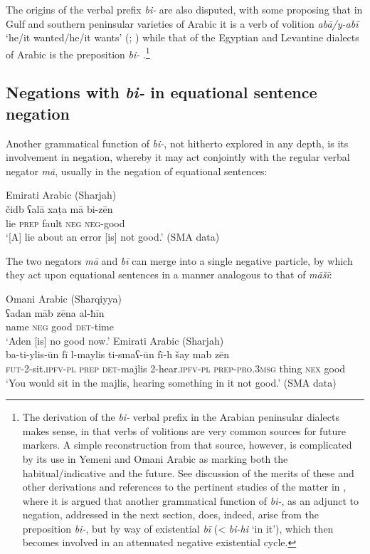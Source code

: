 \documentclass[output=paper]{langsci/langscibook}
\begin{document}
The origins of the verbal prefix \textit{bi-} are also disputed, with some proposing that in Gulf and southern peninsular varieties of Arabic it is a verb of volition \textit{abā/y-abī} ‘he/it wanted/he/it wants’ (\citealp[67]{retsoe2014a}; \citealp[217--219]{owens2018a}) while that of the Egyptian and Levantine dialects of Arabic is the preposition \textit{bi-} \citep[66, 70]{retsoe2014a}.\footnote{The derivation of the \textit{bi-} verbal prefix in the Arabian peninsular dialects makes sense, in that verbs of volitions are very common sources for future markers. A simple reconstruction from that source, however, is complicated by its use in Yemeni and Omani Arabic as marking both the habitual/indicative and the future. See discussion of the merits of these and other derivations and references to the pertinent studies of the matter in \citet{wilmsen2020b}, where it is argued that another grammatical function of \textit{bi-}, as an adjunct to negation, addressed in the next section, does, indeed, arise from the preposition \textit{bi-}, but by way of existential \textit{bī} (< \textit{bi-hi} ‘in it’), which then becomes involved in an attenuated negative existential cycle.}

\subsection{Negations with \textit{bi-} in equational sentence negation} \label{s:WiAR-4.2}

Another grammatical function of \textit{bi-}, not hitherto explored in any depth, is its involvement in negation, whereby it may act conjointly with the regular verbal negator \textit{mā}, usually in the negation of equational sentences:

\ea Emirati Arabic (Sharjah)\label{ex:WiAR-27}\\
	\gll čidb ʕalā xaṭa mā bi-zēn\\
	lie \textsc{prep} fault \textsc{neg} \textsc{neg}-good\\
	\glt ‘[A] lie about an error [is] not good.’ (SMA data)
\z

The two negators \textit{mā} and \textit{bī} can merge into a single negative particle, by which they act upon equational sentences in a manner analogous to that of \textit{māšī}:

\ea \label{ex:WiAR-28}
  \ea Omani Arabic (Sharqiyya)\\
  	\gll ʕadan māb zēna al-ħīn\\
	name \textsc{neg} good \textsc{det}-time\\
  	\glt ‘Aden [is] no good now.’ \citep[485]{holes2008a}
  \ex Emirati Arabic (Sharjah)\\
  	\gll ba-ti-ylis-ūn fī l-maylis ti-smaʕ-ūn fī-h šay mab zēn\\
  	\textsc{fut}-2-sit.\textsc{ipfv-pl} \textsc{prep} \textsc{det}-majlis 2-hear.\textsc{ipfv-pl} \textsc{prep-pro.3msg} thing \textsc{nex} good\\
  	\glt ‘You would sit in the majlis, hearing something in it not good.’ (SMA data)
\z \z
\end{document}
